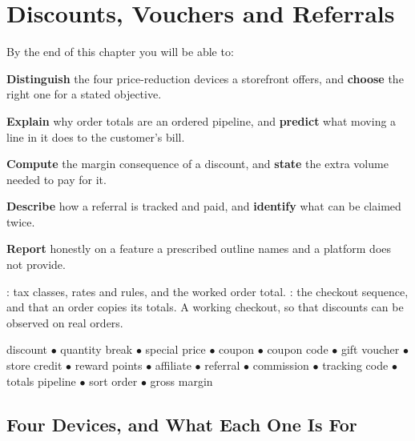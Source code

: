 \chapter{Discounts, Vouchers and Referrals}\label{ch:discounts}

\begin{outcomes}
By the end of this chapter you will be able to:
\begin{tight}
  \item \textbf{Distinguish} the four price-reduction devices a storefront
        offers, and \textbf{choose} the right one for a stated objective.
  \item \textbf{Explain} why order totals are an ordered pipeline, and
        \textbf{predict} what moving a line in it does to the customer's bill.
  \item \textbf{Compute} the margin consequence of a discount, and
        \textbf{state} the extra volume needed to pay for it.
  \item \textbf{Describe} how a referral is tracked and paid, and
        \textbf{identify} what can be claimed twice.
  \item \textbf{Report} honestly on a feature a prescribed outline names and a
        platform does not provide.
\end{tight}
\end{outcomes}

\begin{prereq}
: tax classes, rates and rules, and the worked order total.
: the checkout sequence, and that an order copies its totals.
A working checkout, so that discounts can be observed on real orders.
\end{prereq}

\begin{keyterms}
discount $\bullet$ quantity break $\bullet$ special price $\bullet$ coupon
$\bullet$ coupon code $\bullet$ gift voucher $\bullet$ store credit $\bullet$
reward points $\bullet$ affiliate $\bullet$ referral $\bullet$ commission
$\bullet$ tracking code $\bullet$ totals pipeline $\bullet$ sort order
$\bullet$ gross margin
\end{keyterms}

\section{Four Devices, and What Each One Is For}


